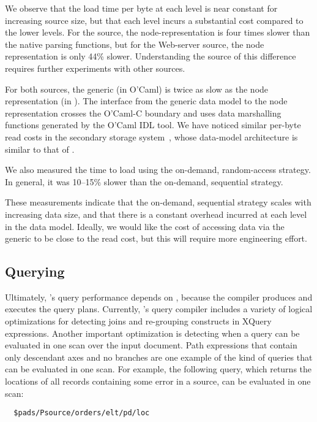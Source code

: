 We observe that the load time per byte at each level is near constant for
increasing source size, but that each level incurs a substantial cost
compared to the lower levels.  For the \dibbler{} source, the \padx{}
node-representation is four times slower than the native \pads{}
parsing functions, but for the Web-server source, the \padx{} node
representation is only 44\% slower.  Understanding the source of this
difference requires further experiments with other sources.

For both sources, the generic \condm{} (in O'Caml) is twice as slow as
the node representation (in \C{}).  The interface from the generic data
model to the node representation crosses the O'Caml-C boundary and
uses data marshalling functions generated by the O'Caml IDL tool.  We
have noticed similar per-byte read costs in the \Galax{} secondary
storage system~\cite{galax:ximep2004}, whose data-model architecture
is similar to that of \padx{}. 

We also measured the time to load using the on-demand, random-access
strategy.  In general, it was 10--15\% slower than the on-demand,
sequential strategy. 

These measurements indicate that the on-demand, sequential strategy
scales with increasing data size, and that there is a constant
overhead incurred at each level in the data model.  Ideally, we would
like the cost of accessing data via the generic \condm{} to be close
to the \pads{} read cost, but this will require more engineering
effort.


\subsection{Querying}

Ultimately, \padx{}'s query performance depends on \Galax{}, because the
\Galax{} compiler produces and executes the query plans.  Currently,
\Galax{}'s query compiler includes a variety of logical optimizations
for detecting joins and re-grouping constructs in XQuery expressions.
Another important optimization is detecting when a query
can be evaluated in one scan over the input document.  Path
expressions that contain only descendant axes and no branches are one
example of the kind of queries that can be evaluated in one scan.  For
example, the following query, which returns the locations of all
records containing some error in a \dibbler{} source, can be evaluated
in one scan:
\begin{verbatim}
  $pads/Psource/orders/elt/pd/loc
\end{verbatim}

